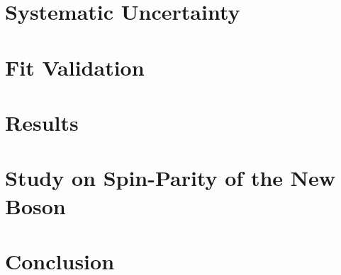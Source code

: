 \documentclass[12pt,chapterheads]{ucsd}
\begin{document}
%
\chapter{Systematic Uncertainty}
\label{ch:systematics}


%
\chapter{Fit Validation}
\label{ch:fit_validation}


%
\chapter{Results}
\label{ch:results}


%
\chapter{Study on Spin-Parity of the New Boson}
\label{ch:spin}


%
\chapter{Conclusion}
\label{ch:conclusion}


% 
%


\appendix

%
%

%
%



 \printindex %
\end{document}
